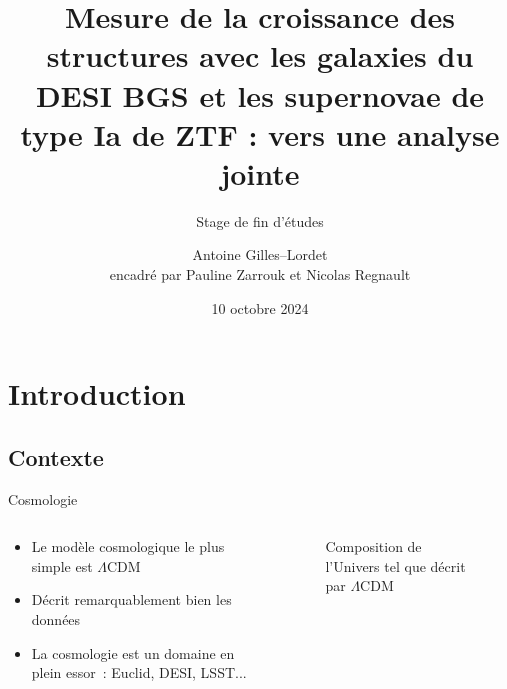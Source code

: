 \documentclass{beamer}
\title[Mesure de la croissance des structures avec DESI et ZTF]{Mesure de la croissance des structures avec les galaxies du DESI BGS et les supernovae de type Ia de ZTF : vers une analyse jointe}
\subtitle{Stage de fin d'études}
\author[Antoine Gilles--Lordet]{Antoine Gilles--Lordet \\ \footnotesize encadré par Pauline Zarrouk et Nicolas Regnault}
\date{10 octobre 2024}
\begin{document}
\frame{\titlepage}

\begin{frame}
	\tableofcontents
\end{frame}

\section{Introduction}

\subsection{Contexte}


\begin{frame}{Cosmologie}
\begin{columns}
\begin{column}{0.5\textwidth}
	\begin{itemize}
		\item 	Le modèle cosmologique le plus simple est $\Lambda$CDM
		\item Décrit remarquablement bien les données
		\item La cosmologie est un domaine en plein essor~: Euclid, DESI, LSST...
	\end{itemize}
\end{column}
\begin{column}{0.5\textwidth}
\begin{figure}
	\centering
	\caption{Composition de l'Univers tel que décrit par $\Lambda$CDM}
\end{figure}
\end{column}
	
\end{columns}
\end{frame}
\end{document}
